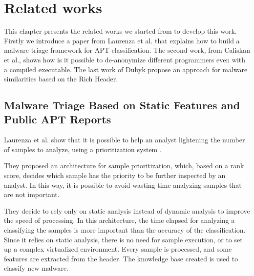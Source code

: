 \chapter{Related works}

This chapter presents the related works we started from to develop this work. Firstly we introduce a paper from Laurenza et al. that explains how to build a malware triage framework for APT classification. The second work, from Caliskan et al., shows how is it possible to de-anonymize different programmers even with a compiled executable. The last work of Dubyk propose an approach for malware similarities based on the Rich Header.

\section{Malware Triage Based on Static Features and Public APT Reports}
Laurenza et al. show that it is possible to help an analyst lightening the number of samples to analyze, using a prioritization system \cite{laurenza2017malware}. 

They proposed an architecture for sample prioritization, which, based on a rank score, decides which sample has the priority to be further inspected by an analyst. In this way, it is possible to avoid wasting time analyzing samples that are not important. 

They decide to rely only on static analysis instead of dynamic analysis to improve the speed of processing. In this architecture, the time elapsed for analyzing a classifying the samples is more important than the accuracy of the classification. Since it relies on static analysis, there is no need for sample execution, or to set up a complex virtualized environment. Every sample is processed, and some features are extracted from the header. The knowledge base created is used to classify new malware.

